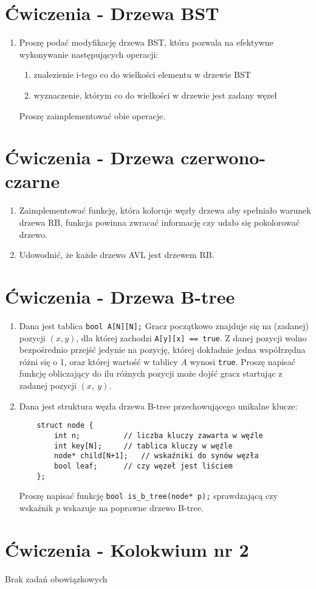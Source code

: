 \documentclass[11pt]{article}
\begin{document}
\section{Ćwiczenia - Drzewa BST}

\begin{enumerate}
	
	\item Proszę podać modyfikację drzewa BST, która pozwala na efektywne
	wykonywanie następujących operacji:
	\begin{enumerate}
		\item znalezienie i-tego co do wielkości elementu w drzewie BST
		\item wyznaczenie, którym co do wielkości w drzewie jest zadany węzeł
	\end{enumerate}
	Proszę zaimplementować obie operacje.
	
\end{enumerate}
\section{Ćwiczenia - Drzewa czerwono-czarne}

\begin{enumerate}
	
	\item Zaimplementować funkcję, która koloruje węzły drzewa aby spełniało warunek drzewa RB,
	funkcja powinna zwracać informację czy udało się pokolorować drzewo.
	\item Udowodnić, że każde drzewo AVL jest drzewem RB.
	
\end{enumerate}
\section{Ćwiczenia - Drzewa B-tree}

\begin{enumerate}
	
	\item Dana jest tablica \texttt{bool A[N][N];} Gracz początkowo znajduje się na (zadanej) pozycji $(x, y)$,
	dla której zachodzi \texttt{A[y][x] == true}. Z danej pozycji wolno bezpośrednio przejść jedynie na pozycję,
	której dokładnie jedna współrzędna różni się o 1, oraz której wartość w tablicy $A$ wynosi \texttt{true}.
	Proszę napisać funkcję obliczający do ilu różnych pozycji może dojść gracz startując z zadanej pozycji $(x,~y)$.
	
	\item Dana jest struktura węzła drzewa B-tree przechowującego unikalne klucze: \newline
\begin{lstlisting}
	struct node {
		int n;			// liczba kluczy zawarta w węźle
		int key[N];		// tablica kluczy w węźle
		node* child[N+1];	// wskaźniki do synów węzła
		bool leaf;		// czy węzeł jest liściem
	};
\end{lstlisting}

	Proszę napisać funkcję \texttt{bool is\_b\_tree(node* p);} sprawdzającą czy
	wskaźnik $p$ wskazuje na poprawne drzewo B-tree.
	
	
\end{enumerate}
\section{Ćwiczenia - Kolokwium nr 2}
	Brak zadań obowiązkowych
	
\end{document}
